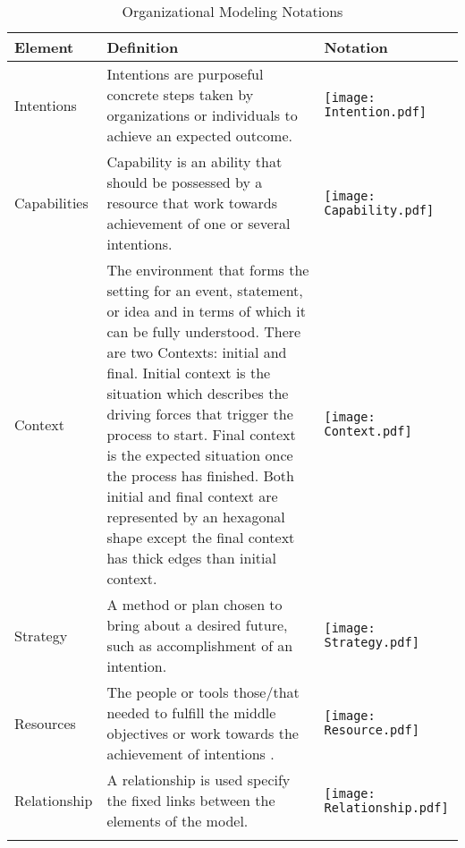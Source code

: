 \begin{center}
	\begin{longtable}{p{3cm}p{10cm}p{3cm}}
		\toprule 
		\textbf{Element} & \textbf{Definition} & \textbf{Notation} \\
		\midrule
		\endfirsthead
		Intentions 			& Intentions are purposeful concrete steps taken by organizations or individuals to achieve an expected outcome. & \begin{center} \texttt{[image: Intention.pdf]}  \end{center}  \\
		
		Capabilities	&  Capability is an ability that should be possessed by a resource that work towards achievement of one or several intentions.   & \begin{center} \texttt{[image: Capability.pdf]} \end{center}  \\
		
		Context				& The environment that forms the setting for an event, statement, or idea and in terms of which it can be fully understood. There are two Contexts: initial and final. Initial context is the situation which describes the driving forces that trigger the process to start. Final context is the expected situation once the process has finished. Both initial and final context are represented by an hexagonal shape except the final context has thick edges than initial context.  & \begin{center} \texttt{[image: Context.pdf]} \end{center}   \\
		\newline
		Strategy		& \newline  A method or plan chosen to bring about a desired future, such as accomplishment of an intention.   & \begin{center} \texttt{[image: Strategy.pdf]} \end{center}  \\
		
		Resources					& The people or tools those/that needed to fulfill the middle objectives or work towards the achievement of intentions . & \begin{center} \texttt{[image: Resource.pdf]} \end{center}  \\
		
		Relationship				& A relationship is used specify the fixed links between the elements of the model.  & \begin{center} \texttt{[image: Relationship.pdf]} \end{center}   \\
		
		\bottomrule
		\caption{Organizational Modeling Notations}
		\label{tab:notations}		
	\end{longtable}	
\end{center}

